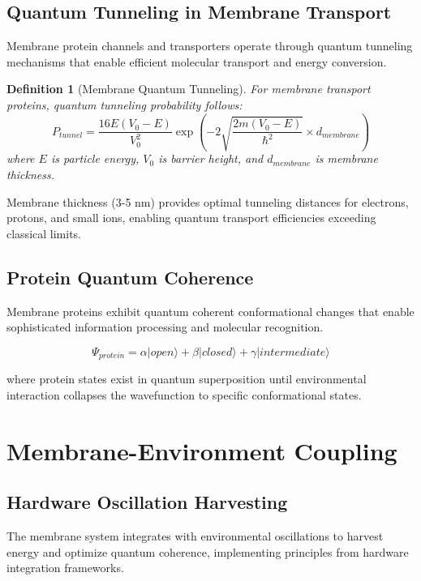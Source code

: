 \documentclass[12pt,a4paper]{article}
\newtheorem{definition}{Definition}
\begin{document}
\subsection{Quantum Tunneling in Membrane Transport}

Membrane protein channels and transporters operate through quantum tunneling mechanisms that enable efficient molecular transport and energy conversion.

\begin{definition}[Membrane Quantum Tunneling]
For membrane transport proteins, quantum tunneling probability follows:
\begin{equation}
P_{tunnel} = \frac{16E(V_0 - E)}{V_0^2} \exp\left(-2\sqrt{\frac{2m(V_0 - E)}{\hbar^2}} \times d_{membrane}\right)
\end{equation}
where $E$ is particle energy, $V_0$ is barrier height, and $d_{membrane}$ is membrane thickness.
\end{definition}

Membrane thickness (3-5 nm) provides optimal tunneling distances for electrons, protons, and small ions, enabling quantum transport efficiencies exceeding classical limits.

\subsection{Protein Quantum Coherence}

Membrane proteins exhibit quantum coherent conformational changes that enable sophisticated information processing and molecular recognition.

\begin{equation}
\Psi_{protein} = \alpha|open\rangle + \beta|closed\rangle + \gamma|intermediate\rangle
\end{equation}

where protein states exist in quantum superposition until environmental interaction collapses the wavefunction to specific conformational states.

\section{Membrane-Environment Coupling}

\subsection{Hardware Oscillation Harvesting}

The membrane system integrates with environmental oscillations to harvest energy and optimize quantum coherence, implementing principles from hardware integration frameworks.
\end{document}
